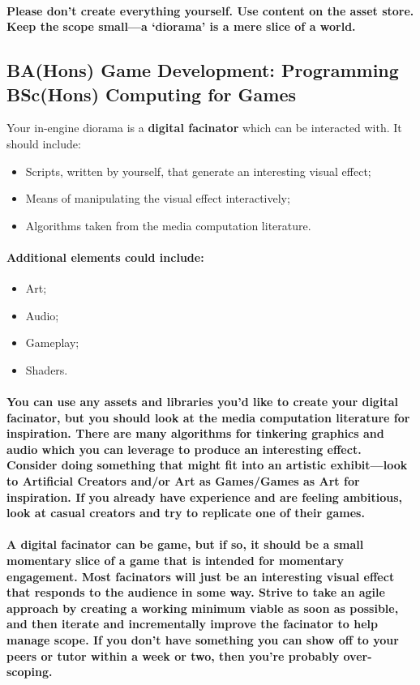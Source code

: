 \documentclass{../../fal_assignment}
\begin{document}
\paragraph{Please don’t create everything yourself. Use content on the asset store. Keep the scope small---a ‘diorama’ is a mere slice of a world.}

\subsection*{BA(Hons) Game Development: Programming \\ BSc(Hons) Computing for Games}

Your in-engine diorama is a \textbf{digital facinator} which can be interacted with. It should include:
\begin{itemize}
\item Scripts, written by yourself, that generate an interesting visual effect;
\item Means of manipulating the visual effect interactively; 
\item Algorithms taken from the media computation literature.
\end{itemize}
\paragraph{Additional elements could include:}
\begin{itemize}
\item Art;
\item Audio;
\item Gameplay;
\item Shaders.
\end{itemize}
\paragraph{You can use any assets and libraries you'd like to create your digital facinator, but you should look at the media computation literature for inspiration. There are many algorithms for tinkering graphics and audio which you can leverage to produce an interesting effect. Consider doing something that might fit into an artistic exhibit---look to Artificial Creators and/or Art as Games/Games as Art for inspiration. If you already have experience and are feeling ambitious, look at casual creators and try to replicate one of their games.}

\paragraph{A digital facinator can be game, but if so, it should be a small momentary slice of a game that is intended for momentary engagement. Most facinators will just be an interesting visual effect that responds to the audience in some way. Strive to take an agile approach by creating a working minimum viable as soon as possible, and then iterate and incrementally improve the facinator to help manage scope. If you don't have something you can show off to your peers or tutor within a week or two, then you're probably over-scoping.}
\end{document}
